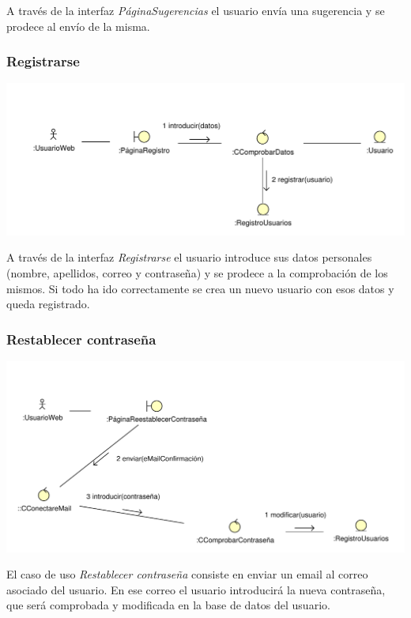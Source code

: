 \documentclass[11pt, a4paper, twoside, titlepage]{article}
\begin{document}
					A través de la interfaz {\itshape PáginaSugerencias} el usuario envía una sugerencia y se prodece al envío de la misma.

			\subsubsection{Registrarse}
				\begin{center}
					\includegraphics[scale=.8]{analisis/diagramas/registrarse.pdf}
				\end{center}
				
					A través de la interfaz {\itshape Registrarse} el usuario introduce sus datos personales (nombre, apellidos, correo y contraseña) y se prodece a la comprobación de los mismos. Si todo ha ido correctamente se crea un nuevo usuario con esos datos y queda registrado.

			\subsubsection{Restablecer contraseña}
				\begin{center}
					\includegraphics[scale=.77]{analisis/diagramas/restablecercontrasena.pdf}
				\end{center}
				
					El caso de uso {\itshape Restablecer contraseña} consiste en enviar un email  al correo asociado del usuario. En ese correo el usuario introducirá la nueva contraseña, que será comprobada y modificada en la base de datos del usuario.
			
\end{document}
